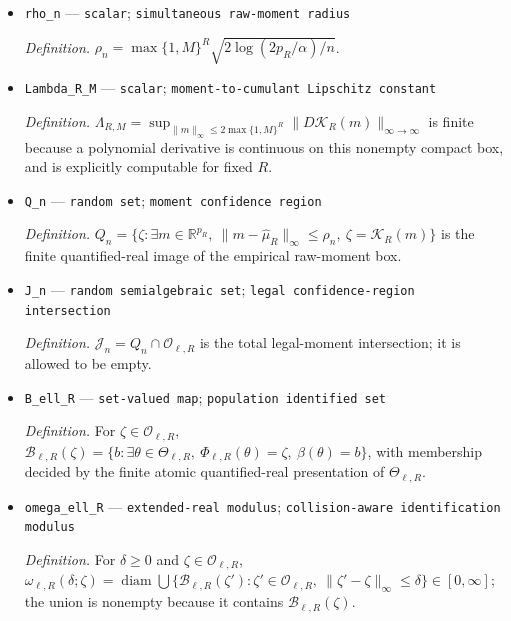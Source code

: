 \documentclass{article}
\begin{document}
\begin{itemize}
  \item \texttt{rho\_\allowbreak{}n} --- \texttt{scalar}; \texttt{simultaneous raw-\allowbreak{}moment radius}
  \par\smallskip\noindent\emph{Definition.} \(\rho_n=\max\{1,M\}^{R}\sqrt{2\log(2p_R/\alpha)/n}\).
  \item \texttt{Lambda\_\allowbreak{}R\_\allowbreak{}M} --- \texttt{scalar}; \texttt{moment-\allowbreak{}to-\allowbreak{}cumulant Lipschitz constant}
  \par\smallskip\noindent\emph{Definition.} \(\Lambda_{R,M}=\sup_{\lVert m\rVert_{\infty}\le2\max\{1,M\}^{R}}\lVert D\mathcal K_R(m)\rVert_{\infty\to\infty}\) is finite because a polynomial derivative is continuous on this nonempty compact box, and is explicitly computable for fixed \(R\).
  \item \texttt{Q\_\allowbreak{}n} --- \texttt{random set}; \texttt{moment confidence region}
  \par\smallskip\noindent\emph{Definition.} \(Q_n=\{\zeta:\exists m\in\mathbb R^{p_R},\ \lVert m-\widehat\mu_R\rVert_{\infty}\le\rho_n,\ \zeta=\mathcal K_R(m)\}\) is the finite quantified-real image of the empirical raw-moment box.
  \item \texttt{J\_\allowbreak{}n} --- \texttt{random semialgebraic set}; \texttt{legal confidence-\allowbreak{}region intersection}
  \par\smallskip\noindent\emph{Definition.} \(\mathcal J_n=Q_n\cap\mathcal O_{\ell,R}\) is the total legal-moment intersection; it is allowed to be empty.
  \item \texttt{B\_\allowbreak{}ell\_\allowbreak{}R} --- \texttt{set-\allowbreak{}valued map}; \texttt{population identified set}
  \par\smallskip\noindent\emph{Definition.} For \(\zeta\in\mathcal O_{\ell,R}\), \(\mathcal B_{\ell,R}(\zeta)=\{b:\exists\theta\in\Theta_{\ell,R},\ \Phi_{\ell,R}(\theta)=\zeta,\ \beta(\theta)=b\}\), with membership decided by the finite atomic quantified-real presentation of \(\Theta_{\ell,R}\).
  \item \texttt{omega\_\allowbreak{}ell\_\allowbreak{}R} --- \texttt{extended-\allowbreak{}real modulus}; \texttt{collision-\allowbreak{}aware identification modulus}
  \par\smallskip\noindent\emph{Definition.} For \(\delta\ge0\) and \(\zeta\in\mathcal O_{\ell,R}\), \(\omega_{\ell,R}(\delta;\zeta)=\operatorname{diam}\bigcup\{\mathcal B_{\ell,R}(\zeta'):\zeta'\in\mathcal O_{\ell,R},\ \lVert\zeta'-\zeta\rVert_{\infty}\le\delta\}\in[0,\infty]\); the union is nonempty because it contains \(\mathcal B_{\ell,R}(\zeta)\).

\end{itemize}
\end{document}
